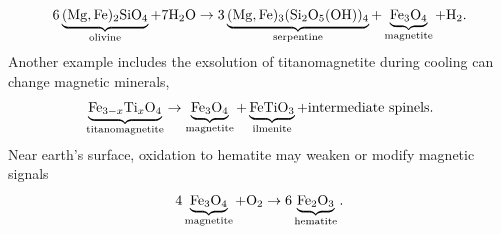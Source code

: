 \documentclass[11pt,a4paper]{article}
\begin{document}
%
%
%
%
\[
    6\underbrace{\ce{(Mg,Fe)2SiO4}}_{\text{olivine}} + 7\ce{H2O} \rightarrow
    3\underbrace{\ce{(Mg,Fe)3(Si_2O_5(OH))4}}_{\text{serpentine}} +
    \underbrace{\ce{Fe3O4}}_{\text{magnetite}} + \ce{H2} .
\]
Another example includes the exsolution of titanomagnetite during cooling can change magnetic minerals,
\[
    \underbrace{\ce{Fe_{3-x}Ti_xO4}}_{\text{titanomagnetite}} \rightarrow
    \underbrace{\ce{Fe3O4}}_{\text{magnetite}} +
    \underbrace{\ce{FeTiO3}}_{\text{ilmenite}} + \text{intermediate~spinels} .
\]
Near earth's surface, oxidation to hematite may weaken or modify magnetic signals
\[
    4\underbrace{\ce{Fe3O4}}_{\text{magnetite}} + \ce{O2} \rightarrow
    6\underbrace{\ce{Fe2O3}}_{\text{hematite}} .
\]
\end{document}
